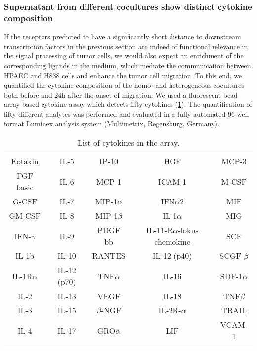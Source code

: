 \subsubsection{Supernatant  from different cocultures show distinct cytokine composition}

If the receptors predicted to have a significantly short
distance to downstream transcription factors in the previous section are indeed of functional
relevance in the signal processing of tumor cells, we would also expect an
enrichment of the corresponding ligands in the medium,
which mediate the communication between
HPAEC and H838 cells and enhance the tumor cell migration.
To this end, we quantified the cytokine composition
of the  homo- and heterogeneous cocultures
both before and 24h after the onset of migration.
We used a  fluorescent bead array based cytokine assay which detects fifty cytokines (\ref{table:cytokine}).
The quantification of fifty different analytes was performed and evaluated in a  fully automated 96-well format Luminex analysis system (Multimetrix, Regensburg,  Germany). 

\clearpage
\begin{longtable}{ccccc}
\caption{List of cytokines in the array.} \\ 
\hline
Eotaxin & IL-5 &   IP-10 &  HGF & MCP-3\\
\rowcolor{Gray} FGF basic &  IL-6 &   MCP-1 &  ICAM-1 & M-CSF\\
G-CSF &  IL-7 &   MIP-1$\alpha$ & IFN$\alpha$2 & MIF\\
\rowcolor{Gray} GM-CSF & IL-8 &   MIP-1$\beta$ &  IL-1$\alpha$ & MIG\\
IFN-$\gamma$ &  IL-9&    PDGF bb&  IL-11-R$\alpha$-lokus chemokine & SCF\\
\rowcolor{Gray} IL-1b &  IL-10 &  RANTES & IL-12 (p40) & SCGF-$\beta$\\
IL-1R$\alpha$ &  IL-12 (p70) &  TNF$\alpha$ &   IL-16 &  SDF-1$\alpha$\\
\rowcolor{Gray} IL-2 &   IL-13 &  VEGF &   IL-18 &  TNF$\beta$\\
IL-3 &   IL-15 &  $\beta$-NGF&  IL-2R-$\alpha$ &   TRAIL\\
\rowcolor{Gray} IL-4 &   IL-17 &  GRO$\alpha$ &  LIF &VCAM-1\\
\hline
\label{table:cytokine}
\end{longtable}
\newpage


